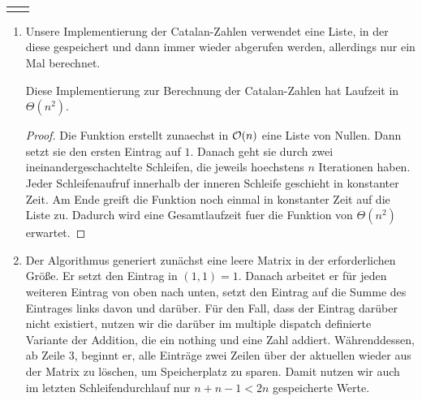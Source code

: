 \documentclass{scrartcl} %
\makeatletter
\newcommand{\headvorlage}{	
	\group{24} \hfill \textbf{\semester} \\
	\begin{tabular}{@{}l r}
		\student{Philine Stella Bock}{507316}
		\student{Devagya Sharma}{495395}
		\student{Simon Seemüller}{513084}
	\end{tabular}
	\haloesung{02}
}
\makeatother
\begin{document}
	\setcounter{auf}{0}
	\headvorlage
    \begin{aufgabe}
        \begin{enumerate}[label=(\alph*)]
            \item Unsere Implementierung der Catalan-Zahlen verwendet eine Liste, in der diese gespeichert und dann immer wieder abgerufen werden, allerdings nur ein Mal berechnet.
            
            \begin{theorem*}
                Diese Implementierung zur Berechnung der Catalan-Zahlen hat Laufzeit in $\Theta(n^2)$.
            \end{theorem*}
            \begin{proof}
                Die Funktion erstellt zunaechst in $\operatorname{\mathcal{O}}(n)$ eine Liste von Nullen. Dann setzt sie den ersten Eintrag auf $1$. Danach geht sie durch zwei ineinandergeschachtelte Schleifen, die jeweils hoechstens $n$ Iterationen haben. Jeder Schleifenaufruf innerhalb der inneren Schleife geschieht in konstanter Zeit. Am Ende greift die Funktion noch einmal in konstanter Zeit auf die Liste zu. Dadurch wird eine Gesamtlaufzeit fuer die Funktion von $\Theta(n^2)$ erwartet.
            \end{proof}
            \item Der Algorithmus generiert zunächst eine leere Matrix in der erforderlichen Größe. Er setzt den Eintrag in $(1, 1) = 1$. Danach arbeitet er für jeden weiteren Eintrag von oben nach unten, setzt den Eintrag auf die Summe des Eintrages links davon und darüber. Für den Fall, dass der Eintrag darüber nicht existiert, nutzen wir die darüber im multiple dispatch definierte Variante der Addition, die ein {\ttfamily nothing} und eine Zahl addiert. Währenddessen, ab Zeile 3, beginnt er, alle Einträge zwei Zeilen über der aktuellen wieder aus der Matrix zu löschen, um Speicherplatz zu sparen. Damit nutzen wir auch im letzten Schleifendurchlauf nur $n + n - 1 < 2n$ gespeicherte Werte.
            
        \end{enumerate}
    \end{aufgabe}
\end{document}
